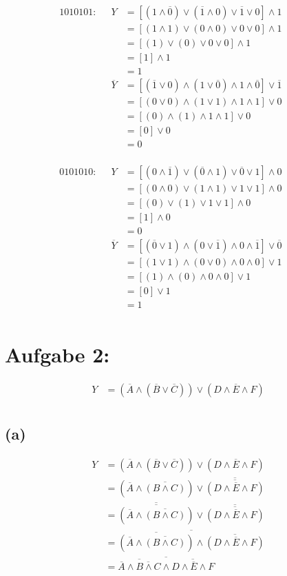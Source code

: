 \documentclass[]{article}
\newcommand{\V}{\lor}
\newcommand{\A}{\land}
\newcommand{\T}[1]{\overline{#1}}
\begin{document}
\begin{multicols*}{2}
	\begin{align*}
		\text{1010101:}&& Y &= [(1 \A \T{0})\V (\T{1} \A 0) \V \T{1} \V 0] \A 1 &&\\
		&& &= [(1 \A 1)\V (0 \A 0) \V 0 \V 0] \A 1 &&\\
		&& &= [(1)\V (0) \V 0 \V 0] \A 1 &&\\
		&& &= [1] \A 1 &&\\
		&& &= 1 &&\\
		&& \T{Y} &= [(\T{1} \V 0)\A (1 \V \T{0}) \A 1 \A \T{0}] \V \T{1} &&\\
		&& &= [(0 \V 0)\A (1 \V1) \A 1 \A 1] \V 0 &&\\
		&& &= [(0)\A (1) \A 1 \A 1] \V 0 &&\\
		&& &= [0] \V 0 &&\\
		&& &= 0 &&\\
	\end{align*}

	\begin{align*}
		\text{0101010:}&& Y &= [(0 \A \T{1})\V (\T{0} \A 1) \V \T{0} \V 1] \A 0 &&\\
		&& &= [(0 \A 0)\V (1 \A 1) \V 1 \V 1] \A 0 &&\\
		&& &= [(0)\V (1) \V 1 \V 1] \A 0 &&\\
		&& &= [1] \A 0 &&\\
		&& &= 0 &&\\
		&& \T{Y} &= [(\T{0} \V 1)\A (0 \V \T{1}) \A 0 \A \T{1}] \V \T{0} &&\\
		&& &= [(1 \V 1)\A (0 \V 0) \A 0 \A 0] \V 1 &&\\
		&& &= [(1)\A (0) \A 0 \A 0] \V 1 &&\\
		&& &= [0] \V 1 &&\\
		&& &= 1 &&\\
	\end{align*}
	\end{multicols*}
\section*{Aufgabe 2:}
	\begin{align*}
		&& Y &= (\T{A} \A (\T{B}\V \T{C})) \V (D \A \T{E} \A F) &&\\
	\end{align*}
\subsection*{(a)}
	\begin{align*}
		&& Y &= (\T{A} \A (\T{B}\V \T{C})) \V (D \A \T{E} \A F) &&\\
		&& &= (\T{A} \A \T{(B \A C)}) \V \T{\T{(D \A \T{E} \A F)}} &&\\
		&& &= \T{\T{(\T{A} \A \T{(B \A C)})}} \V \T{\T{(D \A \T{E} \A F)}} &&\\
		&& &= \T{\T{(\T{A} \A \T{(B \A C)})} \A \T{(D \A \T{E} \A F)}} &&\\
		&& &= \T{\T{\T{A} \A \T{B \A C}} \A \T{D \A \T{E} \A F}} &&\\
	\end{align*}
\end{document}
